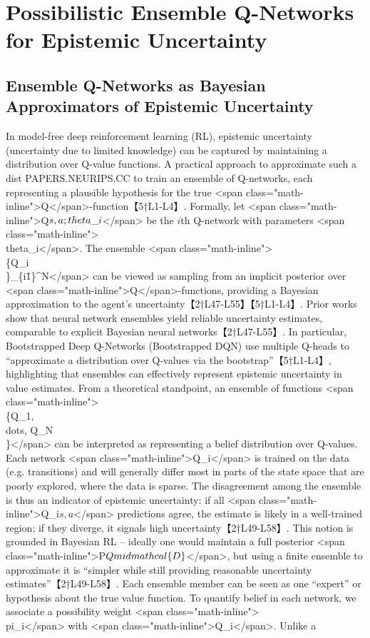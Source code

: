 \documentclass{article}
\begin{document}
\section*{Possibilistic Ensemble Q-Networks for Epistemic Uncertainty}
\subsection*{Ensemble Q-Networks as Bayesian Approximators of Epistemic Uncertainty}
In model-free deep reinforcement learning (RL), epistemic uncertainty (uncertainty due to limited knowledge) can be captured by maintaining a distribution over Q-value functions. A practical approach to approximate such a dist​
PAPERS.NEURIPS.CC
 to train an ensemble of Q-networks, each representing a plausible hypothesis for the true <span class="math-inline">Q</span>-function【5†L1-L4】. Formally, let <span class="math-inline">Q\(s,a;\\theta\_i\)</span> be the $i$th Q-network with parameters <span class="math-inline">\\theta\_i</span>. The ensemble <span class="math-inline">\\\{Q\_i\\\}\_\{i\=1\}^N</span> can be viewed as sampling from an implicit posterior over <span class="math-inline">Q</span>-functions, providing a Bayesian approximation to the agent’s uncertainty【2†L47-L55】【5†L1-L4】. Prior works show that neural network ensembles yield reliable uncertainty estimates, comparable to explicit Bayesian neural networks【2†L47-L55】. In particular, Bootstrapped Deep Q-Networks (Bootstrapped DQN) use multiple Q-heads to “approximate a distribution over Q-values via the bootstrap”【5†L1-L4】, highlighting that ensembles can effectively represent epistemic uncertainty in value estimates. From a theoretical standpoint, an ensemble of functions <span class="math-inline">\\\{Q\_1, \\dots, Q\_N\\\}</span> can be interpreted as representing a belief distribution over Q-values. Each network <span class="math-inline">Q\_i</span> is trained on the data (e.g. transitions) and will generally differ most in parts of the state space that are poorly explored, where the data is sparse. The disagreement among the ensemble is thus an indicator of epistemic uncertainty: if all <span class="math-inline">Q\_i\(s,a\)</span> predictions agree, the estimate is likely in a well-trained region; if they diverge, it signals high uncertainty【2†L49-L58】. This notion is grounded in Bayesian RL – ideally one would maintain a full posterior <span class="math-inline">P\(Q \\mid \\mathcal\{D\}\)</span>, but using a finite ensemble to approximate it is “simpler while still providing reasonable uncertainty estimates”【2†L49-L58】. Each ensemble member can be seen as one “expert” or hypothesis about the true value function. To quantify belief in each network, we associate a possibility weight <span class="math-inline">\\pi\_i</span> with <span class="math-inline">Q\_i</span>. Unlike a 
\end{document}
